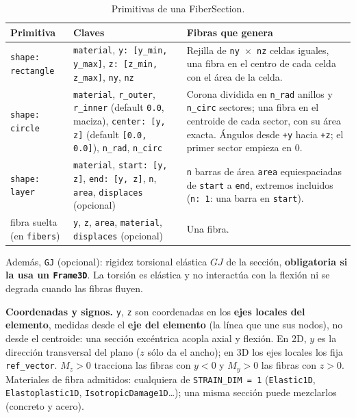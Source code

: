 \documentclass[11pt,oneside]{report}
\begin{document}
\begin{table}[h]
\centering
\caption{Primitivas de una FiberSection.}
\begin{tabularx}{\textwidth}{YYY}
\hline
\textbf{Primitiva} & \textbf{Claves} & \textbf{Fibras que genera} \\
\hline
\texttt{shape: rectangle} & \texttt{material}, \texttt{y: [y\_\allowbreak{}min, y\_\allowbreak{}max]}, \texttt{z: [z\_\allowbreak{}min, z\_\allowbreak{}max]}, \texttt{ny}, \texttt{nz} & Rejilla de \texttt{ny \ensuremath{\times} nz} celdas iguales, una fibra en el centro de cada celda con el área de la celda. \\
\texttt{shape: circle} & \texttt{material}, \texttt{r\_outer}, \texttt{r\_inner} (default \texttt{0.0}, maciza), \texttt{center: [y, z]} (default \texttt{[0.0, 0.0]}), \texttt{n\_rad}, \texttt{n\_circ} & Corona dividida en \texttt{n\_rad} anillos y \texttt{n\_circ} sectores; una fibra en el centroide de cada sector, con su área exacta. Ángulos desde \texttt{+y} hacia \texttt{+z}; el primer sector empieza en 0. \\
\texttt{shape: layer} & \texttt{material}, \texttt{start: [y, z]}, \texttt{end: [y, z]}, \texttt{n}, \texttt{area}, \texttt{displaces} (opcional) & \texttt{n} barras de área \texttt{area} equiespaciadas de \texttt{start} a \texttt{end}, extremos incluidos (\texttt{n: 1}: una barra en \texttt{start}). \\
fibra suelta (en \texttt{fibers}) & \texttt{y}, \texttt{z}, \texttt{area}, \texttt{material}, \texttt{displaces} (opcional) & Una fibra. \\
\hline
\end{tabularx}
\end{table}
Además, \texttt{GJ} (opcional): rigidez torsional elástica $G J$ de la sección, \textbf{obligatoria si la usa un \texttt{Frame3D}}. La torsión es elástica y no interactúa con la flexión ni se degrada cuando las fibras fluyen.

\textbf{Coordenadas y signos.} \texttt{y}, \texttt{z} son coordenadas en los \textbf{ejes locales del elemento}, medidas desde el \textbf{eje del elemento} (la línea que une sus nodos), no desde el centroide: una sección excéntrica acopla axial y flexión. En 2D, $y$ es la dirección transversal del plano ($z$ sólo da el ancho); en 3D los ejes locales los fija \texttt{ref\_vector}. $M_z > 0$ tracciona las fibras con $y < 0$ y $M_y > 0$ las fibras con $z > 0$. Materiales de fibra admitidos: cualquiera de \texttt{STRAIN\_DIM = 1} (\texttt{Elastic1D}, \texttt{Elastoplastic1D}, \texttt{IsotropicDamage1D}\ldots{}); una misma sección puede mezclarlos (concreto y acero).
\end{document}
